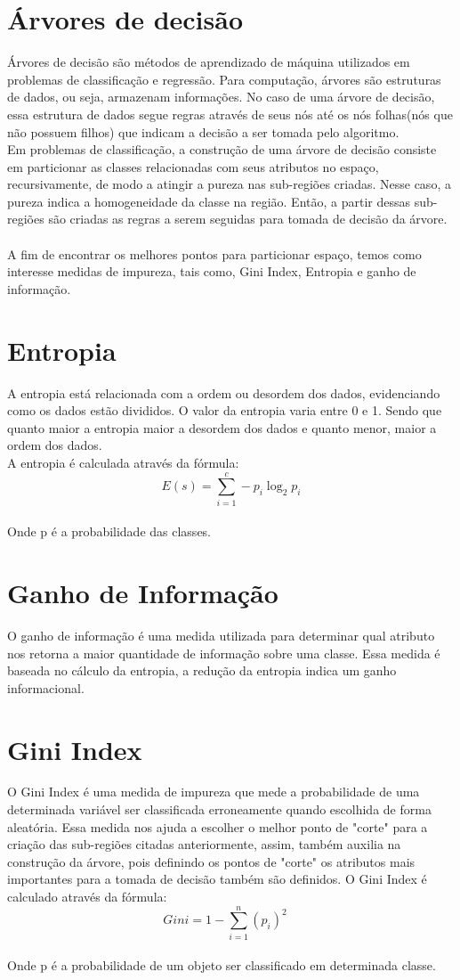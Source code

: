 \documentclass{article}
\begin{document}
\section{Árvores de decisão}

Árvores de decisão são métodos de aprendizado de máquina utilizados em problemas de classificação e regressão. Para computação, árvores são estruturas de dados, ou seja, armazenam informações. No caso de uma árvore de decisão, essa estrutura de dados segue regras através de seus nós até os nós folhas(nós que não possuem filhos) que indicam a decisão a ser tomada pelo algoritmo.
\\
Em problemas de classificação, a construção de uma árvore de decisão consiste em particionar as classes relacionadas com seus atributos no espaço, recursivamente, de modo a atingir a pureza nas sub-regiões criadas. Nesse caso, a pureza indica a homogeneidade da classe na região. Então, a partir dessas sub-regiões são criadas as regras a serem seguidas para tomada de decisão da árvore.
\\
\\
A fim de encontrar os melhores pontos para particionar espaço, temos como interesse medidas de impureza, tais como, Gini Index, Entropia e ganho de informação.

\section{Entropia}
A entropia está relacionada com a ordem ou desordem dos dados, evidenciando como os dados estão divididos. O valor da entropia varia entre 0 e 1. Sendo que quanto maior a entropia maior a desordem dos dados e quanto menor, maior a ordem dos dados.
\\
A entropia é calculada através da fórmula:
\\
$$
{E(s) = \sum_{i=1}^{c} -p_i\log_2p_i}
$$
\\
Onde p é a probabilidade das classes.

\section{Ganho de Informação}
O ganho de informação é uma medida utilizada para determinar qual atributo nos retorna a maior quantidade de informação sobre uma classe. Essa medida é baseada no cálculo da entropia, a redução da entropia indica um ganho informacional.

\section{Gini Index}

O Gini Index é uma medida de impureza que mede a probabilidade de uma determinada variável ser classificada erroneamente quando escolhida de forma aleatória. Essa medida nos ajuda a escolher o melhor ponto de "corte" para a criação das sub-regiões citadas anteriormente, assim, também auxilia na construção da árvore, pois definindo os pontos de "corte" os atributos mais importantes para a tomada de decisão também são definidos.
O Gini Index é calculado através da fórmula:
$$
{Gini = 1 - \sum_{i=1}^{n} (p_i)^2\quad}
$$
\\
Onde p é a probabilidade de um objeto ser classificado em determinada classe.
\end{document}
